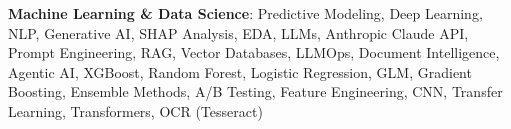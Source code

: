 \item \textbf{Machine Learning \& Data Science}: Predictive Modeling, Deep Learning, NLP, Generative AI, SHAP Analysis, EDA, LLMs, Anthropic Claude API, Prompt Engineering, RAG, Vector Databases, LLMOps, Document Intelligence, Agentic AI, XGBoost, Random Forest, Logistic Regression, GLM, Gradient Boosting, Ensemble Methods, A/B Testing, Feature Engineering, CNN, Transfer Learning, Transformers, OCR (Tesseract)
